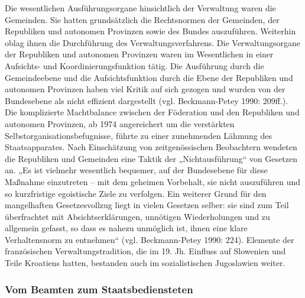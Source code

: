 Die wesentlichen Ausführungsorgane hinsichtlich der Verwaltung waren die Gemeinden. Sie hatten grundsätzlich die Rechtsnormen der Gemeinden, der Republiken und autonomen Provinzen sowie des Bundes auszuführen. Weiterhin oblag ihnen die Durchführung des Verwaltungsverfahrens. Die Verwaltungsorgane der Republiken und autonomen Provinzen waren im Wesentlichen in einer Aufsichts- und Koordinierungsfunktion tätig. Die Ausführung durch die Gemeindeebene und die Aufsichtsfunktion durch die Ebene der Republiken und autonomen Provinzen haben viel Kritik auf sich gezogen und wurden von der Bundesebene als nicht effizient dargestellt (vgl. Beckmann-Petey 1990: 209ff.). Die komplizierte Machtbalance zwischen der Föderation und den Republiken und autonomen Provinzen, ab 1974 angereichert um die verstärkten Selbstorganisationsbefugnisse, führte zu einer zunehmenden Lähmung des Staatsapparates. Nach Einschätzung von zeitgenössischen Beobachtern wendeten die Republiken und Gemeinden eine Taktik der „Nichtausführung“ von Gesetzen an. „Es ist vielmehr wesentlich bequemer, auf der Bundesebene für diese Maßnahme einzutreten – mit dem geheimen Vorbehalt, sie nicht auszuführen und so kurzfristige egoistische Ziele zu verfolgen. Ein weiterer Grund für den mangelhaften Gesetzesvollzug liegt in vielen Gesetzen selber: sie sind zum Teil überfrachtet mit Absichtserklärungen, unnötigen Wiederholungen und zu allgemein gefasst, so dass es nahezu unmöglich ist, ihnen eine klare Verhaltensnorm zu entnehmen“ (vgl. Beckmann-Petey 1990: 224). Elemente der französischen Verwaltungstradition, die im 19. Jh. Einfluss auf Slowenien und Teile Kroatiens hatten, bestanden auch im sozialistischen Jugoslawien weiter.

\subsubsection{Vom Beamten zum Staatsbediensteten}

